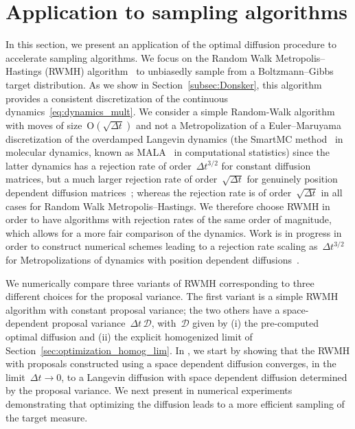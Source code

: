 \documentclass{article}
\newcommand{\Diff}{\mathcal{D}}
\begin{document}
\section{Application to sampling algorithms}
\label{sec:sampling}

In this section, we present an application of the optimal diffusion procedure to accelerate sampling algorithms. We focus on the Random Walk Metropolis--Hastings (RWMH) algorithm~\cite{metropolis,hastings} to unbiasedly sample from a Boltzmann--Gibbs target distribution. As we show in Section~\ref{subsec:Donsker}, this algorithm provides a consistent discretization of the continuous dynamics~\eqref{eq:dynamics_mult}. We consider a simple Random-Walk algorithm with moves of size~$\mathrm{O}(\sqrt{\Delta t})$ and not a Metropolization of a Euler--Maruyama discretization of the overdamped Langevin dynamics (the SmartMC method~\cite{RDF78} in molecular dynamics, known as MALA~\cite{RobertsTweedie1996} in computational statistics) since the latter dynamics has a rejection rate of order~$\Delta t^{3/2}$ for constant diffusion matrices, but a much larger rejection rate of order~$\sqrt{\Delta t}$ for genuinely position dependent diffusion matrices~\cite{FS17}; whereas the rejection rate is of order~$\sqrt{\Delta t}$ in all cases for Random Walk Metropolis--Hastings. We therefore choose RWMH in order to have algorithms with rejection rates of the same order of magnitude, which allows for a more fair comparison of the dynamics. Work is in progress in order to construct numerical schemes leading to a rejection rate scaling as~$\Delta t^{3/2}$ for Metropolizations of dynamics with position dependent diffusions~\cite{LSS22}.  

We numerically compare three variants of RWMH corresponding to three different choices for the proposal variance. The first variant is a simple RWMH algorithm with constant proposal variance; the two others have a space-dependent proposal variance~$\Delta t \, \Diff$, with~$\Diff$ given by (i) the pre-computed optimal diffusion and (ii) the explicit homogenized limit of Section~\ref{sec:optimization_homog_lim}. In , we start by showing that the RWMH with proposals constructed using a space dependent diffusion converges, in the limit~$\Delta t \to 0$, to a Langevin diffusion with space dependent diffusion determined by the proposal variance. We next present in  numerical experiments demonstrating that optimizing the diffusion leads to a more efficient sampling of the target measure.
\end{document}
